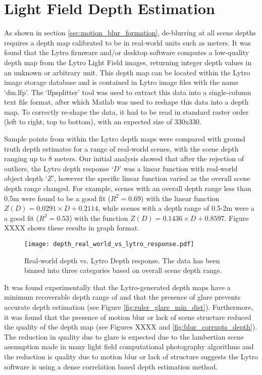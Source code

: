 \section{Light Field Depth Estimation}

As shown in section \ref{sec:motion_blur_formation}, de-blurring at all scene depths requires a depth map calibrated to be in real-world units such as meters.
It was found that the Lytro firmware and/or desktop software computes a low-quality depth map from the Lytro Light Field images, returning integer depth values in an unknown or arbitrary unit.
This depth map can be located within the Lytro image storage database and is contained in Lytro image files with the name \enquote*{dm.lfp}.
The \enquote*{lfpsplitter} tool \cite{patel2013lfptools} was used to extract this data into a single-column text file format, after which Matlab was used to reshape this data into a depth map.
To correctly re-shape the data, it had to be read in standard raster order (left to right, top to bottom), with an expected size of 330x330.

Sample points from within the Lytro depth maps were compared with ground truth depth estimates for a range of real-world scenes, with the scene depth ranging up to 8 meters.
Our initial analysis showed that after the rejection of outliers, the Lytro depth response \enquote*{$D$} was a linear function with real-world object depth \enquote*{$Z$}, however the specific linear function varied as the overall scene depth range changed.
For example, scenes with an overall depth range less than 0.5m were found to be a good fit ($R^2 = 0.69$) with the linear function $Z(D) = 0.0291 \times D + 0.2114$, while scenes with a depth range of 0.5-2m were a a good fit ($R^2 = 0.53$) with the function $Z(D) = 0.1436 \times D + 0.8597$.
Figure XXXX shows these results in graph format.

\begin{figure}[h]
\centering
\caption[Real World Depth vs. Lytro Depth Response]{Real-world depth vs. Lytro Depth response. The data has been binned into three categories based on overall scene depth range.}
\label{fig:depth_real_world_vs_lytro_response}
\texttt{[image: depth\_real\_world\_vs\_lytro\_response.pdf]}
\end{figure}

It was found experimentally that the Lytro-generated depth maps have a minimum recoverable depth range of  and that the presence of glare prevents accurate depth estimation (see Figure \ref{fig:ruler_glare_min_dist}).
Furthermore, it was found that the presence of motion blur or lack of scene structure reduced the quality of the depth map (see Figures XXXX and \ref{fig:blur_corrupts_depth}).
The reduction in quality due to glare is expected due to the lambertian scene assumption made in many light field computational photography algorithms \cite{bishop2009light, liang2011light, baker2003shape} and the reduction is quality due to motion blur or lack of structure suggests the Lytro software is using a dense correlation based depth estimation method.


